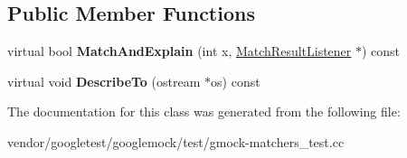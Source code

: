 \subsection*{Public Member Functions}
\begin{DoxyCompactItemize}
\item 
\mbox{\label{classtesting_1_1gmock__matchers__test_1_1_even_matcher_impl_a0ca990403daf3856cda897e4b1a02ae4}} 
virtual bool {\bfseries Match\+And\+Explain} (int x, \hyperlink{classtesting_1_1_match_result_listener}{Match\+Result\+Listener} $\ast$) const
\item 
\mbox{\label{classtesting_1_1gmock__matchers__test_1_1_even_matcher_impl_ae72d37964b4004dfa3a04d7b529ad2f9}} 
virtual void {\bfseries Describe\+To} (ostream $\ast$os) const
\end{DoxyCompactItemize}


The documentation for this class was generated from the following file\+:\begin{DoxyCompactItemize}
\item 
vendor/googletest/googlemock/test/gmock-\/matchers\+\_\+test.\+cc\end{DoxyCompactItemize}

